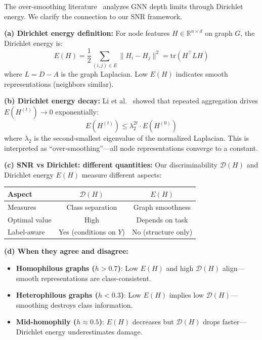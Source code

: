 \begin{remark}
\label{rem:dirichlet_connection}
The over-smoothing literature~\cite{li2018oversmoothing,oono2020exponential} analyzes GNN depth limits through Dirichlet energy. We clarify the connection to our SNR framework.

\textbf{(a) Dirichlet energy definition:}
For node features $H \in \mathbb{R}^{n \times d}$ on graph $G$, the Dirichlet energy is:
\begin{equation}
    E(H) = \frac{1}{2} \sum_{(i,j) \in E} \|H_i - H_j\|^2 = \text{tr}(H^\top L H)
\end{equation}
where $L = D - A$ is the graph Laplacian. Low $E(H)$ indicates smooth representations (neighbors similar).

\textbf{(b) Dirichlet energy decay:}
Li et al.~\cite{li2018oversmoothing} showed that repeated aggregation drives $E(H^{(t)}) \to 0$ exponentially:
\begin{equation}
    E(H^{(t)}) \leq \lambda_2^{2t} \cdot E(H^{(0)})
\end{equation}
where $\lambda_2$ is the second-smallest eigenvalue of the normalized Laplacian. This is interpreted as ``over-smoothing''---all node representations converge to a constant.

\textbf{(c) SNR vs Dirichlet: different quantities:}
Our discriminability $\mathcal{D}(H)$ and Dirichlet energy $E(H)$ measure different aspects:
\begin{center}
\begin{tabular}{lcc}
\toprule
\textbf{Aspect} & \textbf{$\mathcal{D}(H)$} & \textbf{$E(H)$} \\
\midrule
Measures & Class separation & Graph smoothness \\
Optimal value & High & Depends on task \\
Label-aware & Yes (conditions on $Y$) & No (structure only) \\
\bottomrule
\end{tabular}
\end{center}

\textbf{(d) When they agree and disagree:}
\begin{itemize}
    \item \textbf{Homophilous graphs ($h > 0.7$)}: Low $E(H)$ and high $\mathcal{D}(H)$ align---smooth representations are class-consistent.
    \item \textbf{Heterophilous graphs ($h < 0.3$)}: Low $E(H)$ implies low $\mathcal{D}(H)$---smoothing destroys class information.
    \item \textbf{Mid-homophily ($h \approx 0.5$)}: $E(H)$ decreases but $\mathcal{D}(H)$ drops faster---Dirichlet energy underestimates damage.
\end{itemize}


\end{remark}
